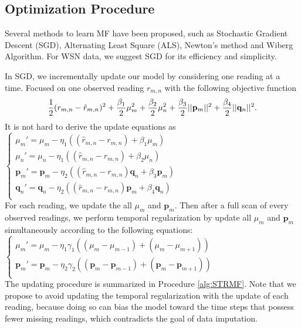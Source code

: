 \subsection{Optimization Procedure}
\label{optimation_procedure}
Several methods to learn MF have been proposed, such as Stochastic Gradient Descent (SGD)\cite{koren2009matrix,chih2008large}, Alternating Least Square (ALS)\cite{koren2009matrix,zhou2008large}, Newton's method\cite{buchanan2005damped} and Wiberg Algorithm\cite{okatani2007wiberg}.
For WSN data, we suggest SGD for its efficiency and simplicity. 

In SGD, we incrementally update our model by considering one reading at a time.
Focused on one observed reading $r_{m,n}$ with the following objective function
\begin{equation*} \small \frac{1}{2}(r_{m,n} - \hat{r}_{m,n})^2 + \frac{\beta_1}{2}\mu_m^2 + \frac{\beta_2}{2}\mu_n^2 + \frac{\beta_3}{2}||\mathbf{p}_m||^2 + \frac{\beta_4}{2}||\mathbf{q}_n||^2.\end{equation*}
It is not hard to derive the update equations as \\
\indent	$\begin{cases}
	\mu_m' = \mu_m - \eta_1 ((\hat{r}_{m,n}-r_{m,n}) + \beta_1 \mu_m) \\
	\mu_n' = \mu_n - \eta_1 ((\hat{r}_{m,n}-r_{m,n}) + \beta_2 \mu_n) \\
	\mathbf{p}_{m}' = \mathbf{p}_{m} - \eta_2 ((\hat{r}_{m,n}-r_{m,n})\mathbf{q}_{n} + \beta_3 \mathbf{p}_{m})\\
	\mathbf{q}_{n}' = \mathbf{q}_{n} - \eta_2 ((\hat{r}_{m,n}-r_{m,n})\mathbf{p}_{m} + \beta_4 \mathbf{q}_{n})\\
	\end{cases}$\\
For each reading, we update the all $\mu_m$ and $\mathbf{p}_m$. Then after a full scan of every observed readings, we perform temporal regularization by update all $\mu_m$ and $\mathbf{p}_m$ simultaneously according to the following equations:\\
\indent $\begin{cases}
	\mu_m' = \mu_m - \eta_1 \gamma_1((\mu_m-\mu_{m-1})+(\mu_m-\mu_{m+1}))\\
	\mathbf{p}_{m}' = \mathbf{p}_{m} - \eta_2 \gamma_2((\mathbf{p}_{m}-\mathbf{p}_{m-1})+(\mathbf{p}_{m}-\mathbf{p}_{m+1}))\\
	\end{cases}$\\

The updating procedure is summarized in Procedure \ref{alg:STRMF}. Note that we propose to avoid updating the temporal regularization with the update of each reading, because doing so can bias the model toward the time steps that possess fewer missing readings, which contradicts the goal of data imputation. 

